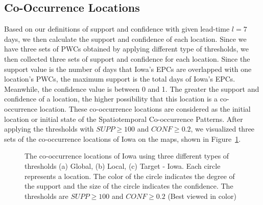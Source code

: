 \documentclass{acm_proc_article-sp}
\begin{document}
\subsection{Co-Occurrence Locations}
Based on our definitions of support and confidence with given lead-time $l=7$ days, we then calculate the support and confidence of each location. Since we have three sets of PWCs obtained by applying different type of thresholds, we then collected three sets of support and confidence for each location. Since the support value is the number of days that Iowa's EPCs are overlapped with one location's PWCs, the maximum support is the total days of Iowa's EPCs. Meanwhile, the confidence value is between 0 and 1. The greater the support and confidence of a location, the higher possibility that this location is a co-occurrence location. These co-occurrence locations are considered as the initial location or initial state of the Spatiotemporal Co-occurrence Patterns. After applying the thresholds with $SUPP \geq 100$ and $CONF \geq 0.2$, we visualized three sets of the co-occurrence locations of Iowa on the maps, shown in Figure~\ref{fig:co-locations}. 

\begin{figure}  
\begin{center}  
\caption{The co-occurrence locations of Iowa using three different types of thresholds (a) Global, (b) Local, (c) Target - Iowa. Each circle represents a location. The color of the circle indicates the degree of the support and the size of the circle indicates the confidence. The thresholds are $SUPP \geq 100$ and $CONF \geq 0.2$ (Best viewed in color) \label{fig:co-locations}}  
\end{center}  
\end{figure}
\end{document}
